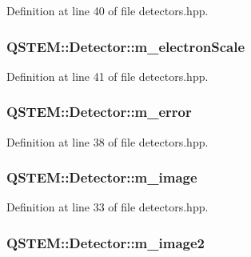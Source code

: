 Definition at line 40 of file detectors.\-hpp.

\hypertarget{class_q_s_t_e_m_1_1_detector_a1b4516f935fb3107fb4da71b0d91cf8b}{
\subsubsection[{m\-\_\-electron\-Scale}]{ Q\-S\-T\-E\-M\-::\-Detector\-::m\-\_\-electron\-Scale}}\label{class_q_s_t_e_m_1_1_detector_a1b4516f935fb3107fb4da71b0d91cf8b}


Definition at line 41 of file detectors.\-hpp.

\hypertarget{class_q_s_t_e_m_1_1_detector_a44b946ec45cf7eb83a5495bde7e42d7b}{
\subsubsection[{m\-\_\-error}]{ Q\-S\-T\-E\-M\-::\-Detector\-::m\-\_\-error}}\label{class_q_s_t_e_m_1_1_detector_a44b946ec45cf7eb83a5495bde7e42d7b}


Definition at line 38 of file detectors.\-hpp.

\hypertarget{class_q_s_t_e_m_1_1_detector_aaf150b56b56b2a0416d687d0603aa1b3}{
\subsubsection[{m\-\_\-image}]{ Q\-S\-T\-E\-M\-::\-Detector\-::m\-\_\-image}}\label{class_q_s_t_e_m_1_1_detector_aaf150b56b56b2a0416d687d0603aa1b3}


Definition at line 33 of file detectors.\-hpp.

\hypertarget{class_q_s_t_e_m_1_1_detector_a9bdb4c469f7044f7a6cc1eaf3e9518bb}{
\subsubsection[{m\-\_\-image2}]{ Q\-S\-T\-E\-M\-::\-Detector\-::m\-\_\-image2}}\label{class_q_s_t_e_m_1_1_detector_a9bdb4c469f7044f7a6cc1eaf3e9518bb}


